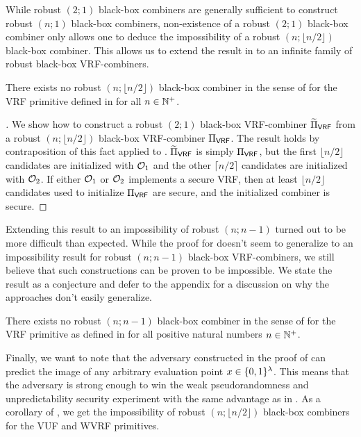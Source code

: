 While robust $(2;1)$ black-box combiners are generally sufficient to construct robust $(n;1)$ black-box combiners,
non-existence of a robust $(2;1)$ black-box combiner 
only allows one to deduce the impossibility of a robust $(n;\lfloor n/2\rfloor)$ black-box combiner.
This allows us to extend the result in  to an infinite family of robust black-box VRF-combiners.

\begin{lemma}\label{lemma:nhalf}
	There exists no robust $(n; \lfloor n/2\rfloor)$ black-box combiner in the sense of  for the VRF primitive 
	defined in  for all $n \in \mathbb{N}^+$.
\end{lemma}

\begin{proof}[]
	We show how to construct a robust $(2;1)$ black-box VRF-combiner $\DAGComb{VRF}$ from a robust $(n;\lfloor n/2\rfloor)$ black-box VRF-combiner $\BBComb{VRF}$.
	The result holds by contraposition of this fact applied to .
	$\DAGComb{VRF}$ is simply $\BBComb{VRF}$, but the first $\lfloor n/2\rfloor$ candidates are initialized with $\mathcal{O}_1$
	and the other $\lceil n/2\rceil$ candidates are initialized with $\mathcal{O}_2$. If either $\mathcal{O}_1$ or $\mathcal{O}_2$
	implements a secure VRF, then at least $\lfloor n/2\rfloor$ candidates used to initialize $\BBComb{VRF}$ are secure,
	and the initialized combiner is secure.
\end{proof}

Extending this result to an impossibility of robust $(n;n-1)$ turned out to be more difficult than expected. 
While the proof for  doesn't seem to generalize to an impossibility result for
robust $(n;n-1)$ black-box VRF-combiners, we still believe that such constructions can be proven to be impossible.
We state the result as a conjecture and defer to the appendix for a discussion on why the approaches don't easily generalize.

\begin{conjecture}
	There exists no robust $(n;n-1)$ black-box combiner in the sense of  for the VRF primitive 
	as defined in  for all positive natural numbers $n \in \mathbb{N}^+$.
\end{conjecture}

Finally, we want to note that the adversary constructed in the proof of 
can predict the image of any arbitrary evaluation point $x \in \{0,1\}^\lambda$. This means that the adversary is strong enough
to win the weak pseudorandomness and unpredictability security experiment with the same advantage as in .
As a corollary of , we get the impossibility of robust $(n;\lfloor n/2\rfloor)$
black-box combiners for the VUF and WVRF primitives.


